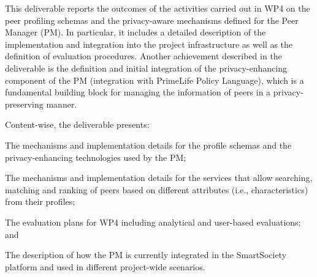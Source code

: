
This deliverable reports the outcomes of the activities carried out in WP4 on the peer profiling schemas and the privacy-aware mechanisms defined for the Peer Manager (PM). In particular, it includes a detailed description of the implementation and integration into the project infrastructure as well as the definition of evaluation procedures. 
Another achievement described in the deliverable  %
is the definition and initial integration of the privacy-enhancing component of the PM (integration with PrimeLife Policy Language), which is a fundamental building block for managing the information of peers in a privacy-preserving manner. 

Content-wise, the deliverable presents:
\begin{inparaenum}[\itshape (i)]
\item The mechanisms and implementation details for the profile schemas and the privacy-enhancing technologies used by the PM;
\item The mechanisms and implementation details for the services that allow searching, matching and ranking of peers based on different attributes (i.e., characteristics) from their profiles;
\item The evaluation plans for WP4 including analytical and user-based evaluations; and
\item The description of how the PM is currently integrated in the SmartSociety platform and used in different project-wide scenarios.
\end{inparaenum}

